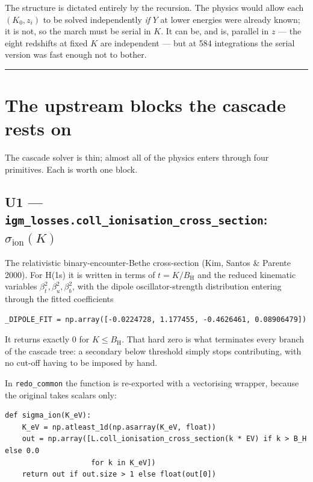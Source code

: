 \documentclass[11pt,a4paper]{article}
\newcommand{\code}[1]{\texttt{\small #1}}
\newcommand{\file}[1]{\texttt{\small #1}}
\newcommand{\BH}{B_{\mathrm{H}}}
\newcommand{\sion}{\sigma_{\mathrm{ion}}}
\begin{document}
The structure is dictated entirely by the recursion.  The physics would allow
each $(K_0,z_i)$ to be solved independently \emph{if} $Y$ at lower energies were
already known; it is not, so the march must be serial in $K$.  It can be, and
is, parallel in $z$ --- the eight redshifts at fixed $K$ are independent --- but
at 584 integrations the serial version was fast enough not to bother.

\bigskip
\hrule

\section{The upstream blocks the cascade rests on}

The cascade solver is thin; almost all of the physics enters through four
primitives.  Each is worth one block.

\subsection*{U1 --- \code{igm\_losses.coll\_ionisation\_cross\_section}: $\sion(K)$}

The relativistic binary-encounter-Bethe cross-section (Kim, Santos \& Parente
2000).  For H(1s) it is written in terms of $t = K/\BH$ and the reduced
kinematic variables $\beta_t^2,\beta_u^2,\beta_b^2$, with the dipole
oscillator-strength distribution entering through the fitted coefficients

\begin{lstlisting}
_DIPOLE_FIT = np.array([-0.0224728, 1.177455, -0.4626461, 0.08906479])
\end{lstlisting}

It returns exactly $0$ for $K \le \BH$.  That hard zero is what terminates every
branch of the cascade tree: a secondary below threshold simply stops
contributing, with no cut-off having to be imposed by hand.

In \file{redo\_common} the function is re-exported with a vectorising wrapper,
because the original takes scalars only:

\begin{lstlisting}
def sigma_ion(K_eV):
    K_eV = np.atleast_1d(np.asarray(K_eV, float))
    out = np.array([L.coll_ionisation_cross_section(k * EV) if k > B_H else 0.0
                    for k in K_eV])
    return out if out.size > 1 else float(out[0])
\end{lstlisting}
\end{document}
